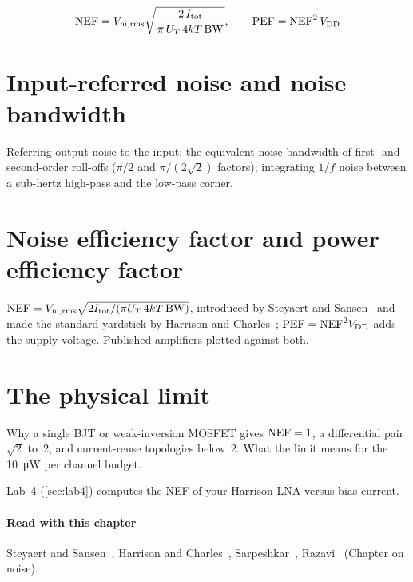 \begin{keyeq}
\begin{equation}
  \mathrm{NEF} = V_\mathrm{ni,rms}\sqrt{\frac{2\,I_\mathrm{tot}}{\pi\, U_T\, 4kT\, \mathrm{BW}}}, \qquad \mathrm{PEF} = \mathrm{NEF}^2\,V_\mathrm{DD}
  \label{eq:nef}
\end{equation}
\end{keyeq}

\section{Input-referred noise and noise bandwidth}\label{sec:ch6-2}
Referring output noise to the input; the equivalent noise bandwidth of first- and second-order roll-offs ($\pi/2$ and $\pi/(2\sqrt2)$ factors); integrating $1/f$ noise between a sub-hertz high-pass and the low-pass corner.

\section{Noise efficiency factor and power efficiency factor}\label{sec:ch6-3}
$\mathrm{NEF} = V_\mathrm{ni,rms}\sqrt{2 I_\mathrm{tot}/(\pi U_T\, 4kT\, \mathrm{BW})}$, introduced by Steyaert and Sansen~\cite{steyaert1987} and made the standard yardstick by Harrison and Charles~\cite{harrison2003}; $\mathrm{PEF} = \mathrm{NEF}^2V_\mathrm{DD}$ adds the supply voltage. Published amplifiers plotted against both.

\section{The physical limit}\label{sec:ch6-4}
Why a single BJT or weak-inversion MOSFET gives $\mathrm{NEF} = 1$, a differential pair $\sqrt2$ to~2, and current-reuse topologies below~2. What the limit means for the \qty{10}{\micro\watt} per channel budget.

\begin{tryit}
Lab~4 (\cref{sec:lab4}) computes the NEF of your Harrison LNA versus bias current.
\end{tryit}

\paragraph{Read with this chapter} Steyaert and Sansen~\cite{steyaert1987}, Harrison and Charles~\cite{harrison2003}, Sarpeshkar~\cite{sarpeshkar}, Razavi~\cite{razavi} (Chapter on noise).
